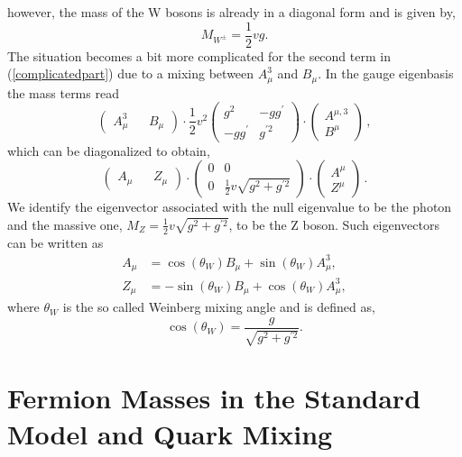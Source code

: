 \documentclass[10pt]{report}
\begin{document}
however, the mass of the W bosons is already in a diagonal form and is given by,
\begin{equation}
M_{W^\pm}= \frac{1}{2} v g .
\end{equation}
%
The situation becomes a bit more complicated for the second term in (\ref{complicatedpart}) due to a mixing between $A_\mu^3$ and $B_\mu$. In the gauge eigenbasis the mass terms read
%
\begin{equation}
\begin{pmatrix}
A_\mu^3 && B_\mu
\end{pmatrix} \cdot  \frac{1}{2} v^2 \begin{pmatrix}
g^2  & -g g^\prime \\
-g g^\prime & g^{\prime 2} 
\end{pmatrix} \cdot \begin{pmatrix}
A^{\mu,3} \\  B^\mu
\end{pmatrix} \, , 
\end{equation} 
%
which can be diagonalized to obtain,
%
\begin{equation}
\begin{pmatrix}
A_\mu && Z_\mu 
\end{pmatrix} \cdot \begin{pmatrix}
0  & 0 \\
0  & \frac{1}{2} v \sqrt{g^2 + g^{\prime 2}} 
\end{pmatrix} \cdot \begin{pmatrix}
A^\mu \\ Z^\mu
\end{pmatrix} \, .  
\end{equation}
We identify the eigenvector associated with the null eigenvalue to be the photon and the massive one, $ M_Z =  \frac{1}{2} v \sqrt{g^2 + g^{\prime 2}} $, to be the Z boson. Such eigenvectors can be written as
%
\begin{align}
A_\mu &=\cos(\theta_W) B_\mu + \sin(\theta_W) A_\mu^3 ,  \\  
Z_\mu & =- \sin(\theta_W) B_\mu + \cos(\theta_W) A_\mu^3 , 
\end{align}
%
where $\theta_W$ is the so called Weinberg mixing angle and is defined as, 
%
\begin{equation}
\cos(\theta_W)=\frac{g}{ \sqrt{g^2 + g^{\prime 2}}} .  
\end{equation}

\section{Fermion Masses in the Standard Model and Quark Mixing}
\label{Chap_1_Sec_3}
\end{document}
